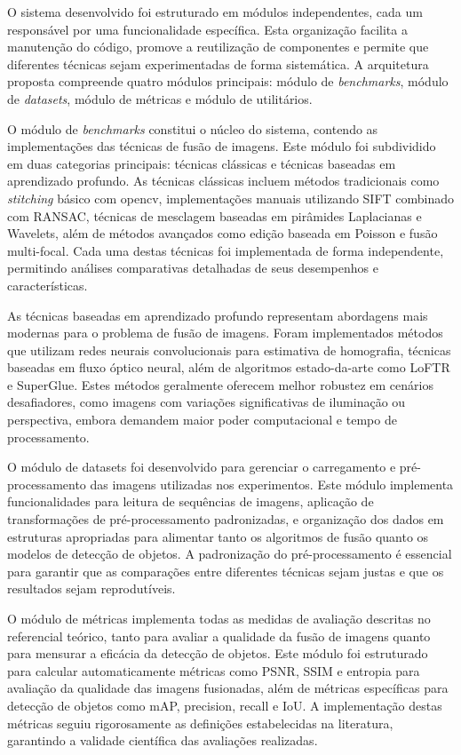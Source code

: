O sistema desenvolvido foi estruturado em módulos independentes, cada um responsável por uma funcionalidade específica. Esta organização facilita a manutenção do código, promove a reutilização de componentes e permite que diferentes técnicas sejam experimentadas de forma sistemática. A arquitetura proposta compreende quatro módulos principais: módulo de \textit{benchmarks}, módulo de \textit{datasets}, módulo de métricas e módulo de utilitários.

O módulo de \textit{benchmarks} constitui o núcleo do sistema, contendo as implementações das técnicas de fusão de imagens. Este módulo foi subdividido em duas categorias principais: técnicas clássicas e técnicas baseadas em aprendizado profundo. As técnicas clássicas incluem métodos tradicionais como \textit{stitching} básico com \gls{opencv}, implementações manuais utilizando SIFT combinado com RANSAC, técnicas de mesclagem baseadas em pirâmides Laplacianas e Wavelets, além de métodos avançados como edição baseada em Poisson e fusão multi-focal. Cada uma destas técnicas foi implementada de forma independente, permitindo análises comparativas detalhadas de seus desempenhos e características.

As técnicas baseadas em aprendizado profundo representam abordagens mais modernas para o problema de fusão de imagens. Foram implementados métodos que utilizam redes neurais convolucionais para estimativa de homografia, técnicas baseadas em fluxo óptico neural, além de algoritmos estado-da-arte como LoFTR e SuperGlue. Estes métodos geralmente oferecem melhor robustez em cenários desafiadores, como imagens com variações significativas de iluminação ou perspectiva, embora demandem maior poder computacional e tempo de processamento.

O módulo de datasets foi desenvolvido para gerenciar o carregamento e pré-processamento das imagens utilizadas nos experimentos. Este módulo implementa funcionalidades para leitura de sequências de imagens, aplicação de transformações de pré-processamento padronizadas, e organização dos dados em estruturas apropriadas para alimentar tanto os algoritmos de fusão quanto os modelos de detecção de objetos. A padronização do pré-processamento é essencial para garantir que as comparações entre diferentes técnicas sejam justas e que os resultados sejam reprodutíveis.

O módulo de métricas implementa todas as medidas de avaliação descritas no referencial teórico, tanto para avaliar a qualidade da fusão de imagens quanto para mensurar a eficácia da detecção de objetos. Este módulo foi estruturado para calcular automaticamente métricas como PSNR, SSIM e entropia para avaliação da qualidade das imagens fusionadas, além de métricas específicas para detecção de objetos como mAP, precision, recall e IoU. A implementação destas métricas seguiu rigorosamente as definições estabelecidas na literatura, garantindo a validade científica das avaliações realizadas.

